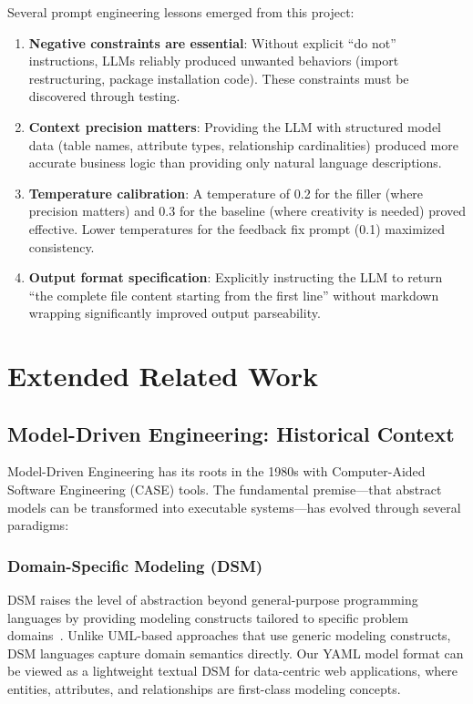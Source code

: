 \documentclass[11pt,a4paper]{article}
\begin{document}
{Several prompt engineering lessons emerged from this project:

\begin{enumerate}[leftmargin=*]
    \item \textbf{Negative constraints are essential}: Without explicit ``do not'' instructions, LLMs reliably produced unwanted behaviors (import restructuring, package installation code). These constraints must be discovered through testing.
    \item \textbf{Context precision matters}: Providing the LLM with structured model data (table names, attribute types, relationship cardinalities) produced more accurate business logic than providing only natural language descriptions.
    \item \textbf{Temperature calibration}: A temperature of 0.2 for the filler (where precision matters) and 0.3 for the baseline (where creativity is needed) proved effective. Lower temperatures for the feedback fix prompt (0.1) maximized consistency.
    \item \textbf{Output format specification}: Explicitly instructing the LLM to return ``the complete file content starting from the first line'' without markdown wrapping significantly improved output parseability.
\end{enumerate}

\newpage
\section{Extended Related Work}
\label{sec:related-extended}

\subsection{Model-Driven Engineering: Historical Context}

Model-Driven Engineering has its roots in the 1980s with Computer-Aided Software Engineering (CASE) tools. The fundamental premise---that abstract models can be transformed into executable systems---has evolved through several paradigms:

\subsubsection{Domain-Specific Modeling (DSM)}

DSM raises the level of abstraction beyond general-purpose programming languages by providing modeling constructs tailored to specific problem domains~\cite{kelly2008domain}. Unlike UML-based approaches that use generic modeling constructs, DSM languages capture domain semantics directly. Our YAML model format can be viewed as a lightweight textual DSM for data-centric web applications, where entities, attributes, and relationships are first-class modeling concepts.

}
\end{document}
